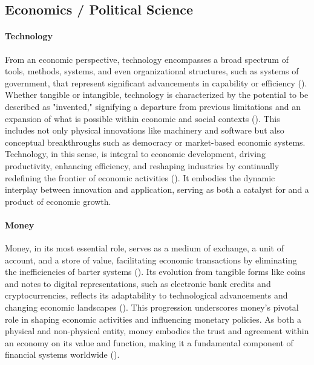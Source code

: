 \documentclass{article}
\begin{document}
\subsection{Economics / Political Science}

\paragraph{Technology}
From an economic perspective, technology encompasses a broad spectrum of tools, methods, systems, and even organizational structures, such as systems of government, that represent significant advancements in capability or efficiency (\cite{schumpeter}). Whether tangible or intangible, technology is characterized by the potential to be described as "invented," signifying a departure from previous limitations and an expansion of what is possible within economic and social contexts (\cite{north}). This includes not only physical innovations like machinery and software but also conceptual breakthroughs such as democracy or market-based economic systems. Technology, in this sense, is integral to economic development, driving productivity, enhancing efficiency, and reshaping industries by continually redefining the frontier of economic activities (\cite{romer}). It embodies the dynamic interplay between innovation and application, serving as both a catalyst for and a product of economic growth.

\paragraph{Money} 
Money, in its most essential role, serves as a medium of exchange, a unit of account, and a store of value, facilitating economic transactions by eliminating the inefficiencies of barter systems (\cite{mishkin}). Its evolution from tangible forms like coins and notes to digital representations, such as electronic bank credits and cryptocurrencies, reflects its adaptability to technological advancements and changing economic landscapes (\cite{nakamoto}). This progression underscores money's pivotal role in shaping economic activities and influencing monetary policies. As both a physical and non-physical entity, money embodies the trust and agreement within an economy on its value and function, making it a fundamental component of financial systems worldwide (\cite{menger}).
\end{document}
